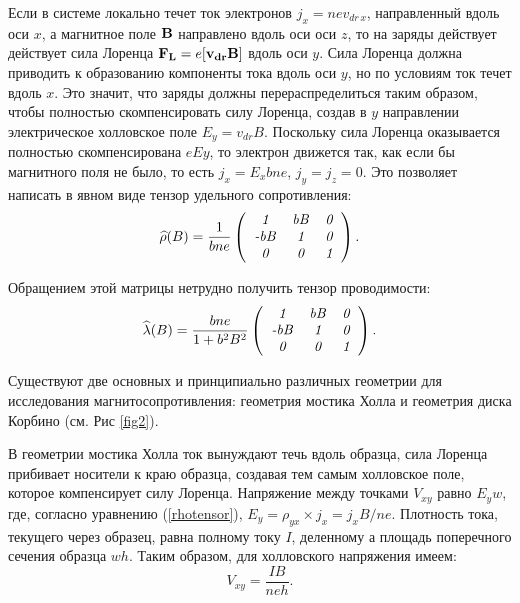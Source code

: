 \documentclass[a4paper,10pt,twoside]{article}
\begin{document}
Если в системе локально течет ток электронов $j_x=nev_{dr\, x}$, направленный вдоль оси $x$, а магнитное поле ${\bf B}$ направлено вдоль оси оси $z$, то на заряды действует действует сила Лоренца ${\bf F_{L}}=e[{\bf v_{dr}B]}$ вдоль оси $y$.
Сила Лоренца должна приводить к образованию компоненты тока вдоль оси $y$, но по условиям ток течет вдоль $x$. Это значит, что заряды должны перераспределиться таким образом, чтобы полностью скомпенсировать силу
Лоренца, создав в $y$ направлении электрическое холловское поле $E_y=v_{dr}B$. Поскольку сила Лоренца
оказывается полностью скомпенсирована $eEy$, то электрон движется так, как если бы магнитного поля не
было, то есть $j_x=E_xbne$, $j_y=j_z=0$. Это позволяет написать в явном виде тензор удельного сопротивления:
\begin{equation}
\widehat{\rho}(B)=\frac{1}{bne}\left(
\begin{tabular}{ccc}
{\it 1} & {\it bB} & {\it 0} \\
{\it -bB} &{\it 1}& {\it 0} \\
{\it 0} &{\it 0}& {\it 1}\\
\end{tabular}
\right).
\label{rhotensor}
\end{equation}

Обращением этой матрицы нетрудно получить тензор проводимости:
\begin{equation}
\widehat{\lambda}(B)=\frac{bne}{1+b^2B^2}\left(
\begin{tabular}{ccc}
{\it 1} & {\it bB} & {\it 0} \\
{\it -bB} &{\it 1}& {\it 0} \\
{\it 0} &{\it 0}& {\it 1}\\
\end{tabular}
\right).
\label{lambdatensor}
\end{equation}

Существуют две основных и принципиально различных геометрии для исследования магнитосопротивления: геометрия
мостика Холла и геометрия диска Корбино (см. Рис \ref{fig2}).

В геометрии мостика Холла ток вынуждают течь вдоль образца, сила Лоренца прибивает носители к краю образца, создавая тем самым холловское поле, которое компенсирует силу Лоренца. Напряжение между точками $V_{xy}$ равно $E_yw$, где, согласно уравнению (\ref{rhotensor}), $E_y=\rho_{yx}\times j_x=j_x B/ne$. Плотность тока, текущего через образец, равна полному току $I$, деленному а площадь поперечного сечения образца $wh$. Таким образом, для холловского напряжения имеем:
\begin{equation}
V_{xy}=\frac{IB}{neh}.
\label{HallVoltage}
\end{equation}
\end{document}
